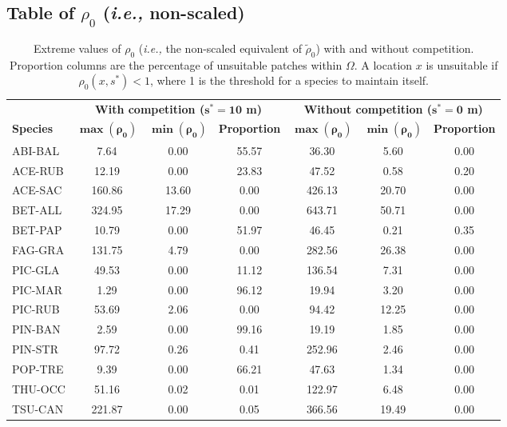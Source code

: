 \documentclass[letterpaper, 12pt]{article}
\newcommand {\ie}{\textit{i.e., }}
\newcommand {\s}{{s}^{*}}
\theoremstyle{theo}
\begin{document}
\begin{refsection}
\begin{onehalfspace}
	\subsection{Table of $ \rho_0 $ (\ie non-scaled)}
	\begin{table}[h]
	\centering
	\caption[Extreme values of $ \rho_0 $]{Extreme values of $ \rho_0 $ (\ie the non-scaled equivalent of $ \tilde \rho_0 $) with and without competition. Proportion columns are the percentage of unsuitable patches within $ \Omega $. A location $ x $ is unsuitable if $ \rho_0(x, \s) < 1 $, where 1 is the threshold for a species to maintain itself. \label{tab::R0_min_max}}
	\begin{tabular}{lcccccc}
		\toprule
			~ & \multicolumn{3}{c}{\textbf{With competition ($ \bm {\s = 10} $ m)}} & \multicolumn{3}{c}{\textbf{Without competition ($ \bm {\s = 0} $ m)}} \\
		\cmidrule(lr){2-4} \cmidrule(lr){5-7}
			\textbf{Species} & $ \bm{\max(\rho_0)} $ & $ \bm{\min(\rho_0)} $ & \textbf{Proportion} & $ \bm{\max(\rho_0)} $ & $ \bm{\min(\rho_0)} $ & \textbf{Proportion} \\
		\midrule
			ABI-BAL & 7.64 & 0.00 & 55.57 & 36.30 & 5.60 & 0.00 \\
			ACE-RUB & 12.19 & 0.00 & 23.83 & 47.52 & 0.58 & 0.20 \\
			ACE-SAC & 160.86 & 13.60 & 0.00 & 426.13 & 20.70 & 0.00 \\
			BET-ALL & 324.95 & 17.29 & 0.00 & 643.71 & 50.71 & 0.00 \\
			BET-PAP & 10.79 & 0.00 & 51.97 & 46.45 & 0.21 & 0.35 \\
			FAG-GRA & 131.75 & 4.79 & 0.00 & 282.56 & 26.38 & 0.00 \\
			PIC-GLA & 49.53 & 0.00 & 11.12 & 136.54 & 7.31 & 0.00 \\
			PIC-MAR & 1.29 & 0.00 & 96.12 & 19.94 & 3.20 & 0.00 \\
			PIC-RUB & 53.69 & 2.06 & 0.00 & 94.42 & 12.25 & 0.00 \\
			PIN-BAN & 2.59 & 0.00 & 99.16 & 19.19 & 1.85 & 0.00 \\
			PIN-STR & 97.72 & 0.26 & 0.41 & 252.96 & 2.46 & 0.00 \\
			POP-TRE & 9.39 & 0.00 & 66.21 & 47.63 & 1.34 & 0.00 \\
			THU-OCC & 51.16 & 0.02 & 0.01 & 122.97 & 6.48 & 0.00 \\
			TSU-CAN & 221.87 & 0.00 & 0.05 & 366.56 & 19.49 & 0.00 \\
		\bottomrule
	\end{tabular}
	\end{table}

\end{onehalfspace}

\clearpage
\printbibliography[heading=subbibliography]
\end{refsection}
\end{document}

